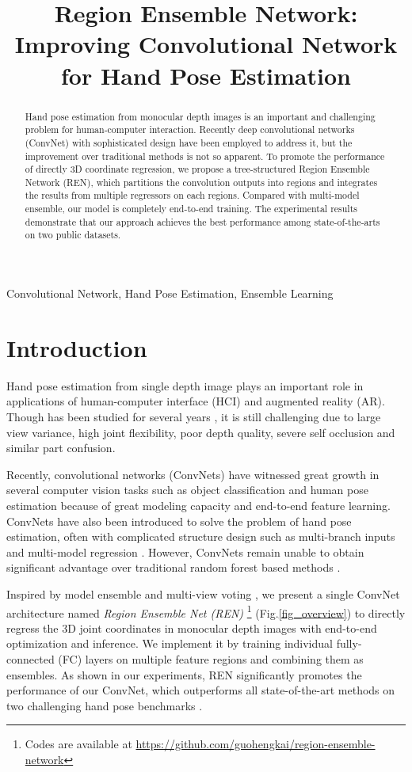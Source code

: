 \documentclass{article}
\title{Region Ensemble Network: Improving Convolutional Network for Hand Pose Estimation}
\begin{document}
\maketitle
\begin{abstract}
Hand pose estimation from monocular depth images is an important and challenging problem for human-computer interaction. Recently deep convolutional networks (ConvNet) with sophisticated design have been employed to address it, but the improvement over traditional methods is not so apparent. To promote the performance of directly 3D coordinate regression, we propose a tree-structured Region Ensemble Network (REN), which partitions the convolution outputs into regions and integrates the results from multiple regressors on each regions. Compared with multi-model ensemble, our model is completely end-to-end training. The experimental results demonstrate that our approach achieves the best performance among state-of-the-arts on two public datasets.
\end{abstract}
\begin{keywords}
Convolutional Network, Hand Pose Estimation, Ensemble Learning
\end{keywords}
\section{Introduction}
Hand pose estimation from single depth image plays an important role in applications of human-computer interface (HCI) and augmented reality (AR). Though has been studied for several years \cite{supancic2015depth}, it is still challenging due to large view variance, high joint flexibility, poor depth quality, severe self occlusion and similar part confusion.

Recently, convolutional networks (ConvNets) have witnessed great growth in several computer vision tasks such as object classification \cite{krizhevsky2012imagenet} and human pose estimation \cite{bulat2016human} because of great modeling capacity and end-to-end feature learning. ConvNets have also been introduced to solve the problem of hand pose estimation, often with complicated structure design such as multi-branch inputs \cite{tompson2014real}\cite{oberweger2015hands} and multi-model regression \cite{oberweger2015hands} \cite{oberwegertraining} \cite{gerobust} \cite{zhang2016learning}. However, ConvNets remain unable to obtain significant advantage over traditional random forest based methods \cite{sun2015cascaded} \cite{wan2016hand}. 

Inspired by model ensemble and multi-view voting \cite{krizhevsky2012imagenet}, we present a single ConvNet architecture named \emph{Region Ensemble Net (REN)} \footnote{Codes are available at \url{https://github.com/guohengkai/region-ensemble-network}} (Fig.\ref{fig_overview}) to directly regress the 3D joint coordinates in monocular depth images with end-to-end optimization and inference. We implement it by training individual fully-connected (FC) layers on multiple feature regions and combining them as ensembles. As shown in our experiments, REN significantly promotes the performance of our ConvNet, which outperforms all state-of-the-art methods on two challenging hand pose benchmarks \cite{tompson2014real} \cite{tang2014latent}.
\end{document}
